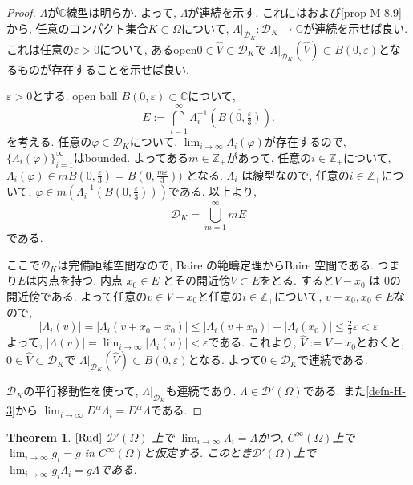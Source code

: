 \documentclass[dvipdfmx,a4paper,11pt]{article} %
\newtheorem{thm}{Theorem}[section]
\theoremstyle{definition}
\theoremstyle{remark}
\numberwithin{equation}{section}
\newcommand{\N}{\mathbb{Z}_+}
\newcommand{\C}{\mathbb{C}}
\begin{document}
\begin{proof}
$\Lambda$が$\mathbb{C}$線型は明らか. 
よって, $\Lambda$が連続を示す. 
これには\cite[Thm 6.6]{Rud}および\ref{prop-M-8.9}から, 
任意のコンパクト集合$K \subset \Omega$について, $\Lambda|_{\mathcal{D}_K} : \mathcal{D}_K \to \C$が連続を示せば良い. 
これは任意の$\varepsilon >0$について, あるopen$0 \in \widehat{V} \subset \mathcal{D}_K $で
$\Lambda|_{\mathcal{D}_K} (\widehat{V})  \subset B(0, \varepsilon) $となるものが存在することを示せば良い. 

$\varepsilon >0$とする. 
open ball $B(0,\varepsilon) \subset \mathbb{C}$について, 
\[
E := \bigcap_{i=1}^\infty \Lambda_i^{-1}(
\overline{B(0,\tfrac{\varepsilon}{3})}).
\]
を考える. 
任意の$\varphi \in \mathcal{D}_K$について, 
$\lim_{i \to \infty} \Lambda_i(\varphi)$が存在するので, 
$\{\Lambda_i(\varphi)\}_{i=1}^\infty$はbounded.
よってある$m \in \N$があって, 任意の$i \in \N$について, 
$\Lambda_i(\varphi) \in m B(0, \tfrac{\varepsilon}{3})=B(0,\tfrac{m \varepsilon}{3}))$ となる.
$\Lambda_i$ は線型なので, 任意の$i \in \N$について,
$\varphi \in m (\Lambda_i^{-1}(B(0,\tfrac{\varepsilon}{3})))$である. 
以上より, 
$$
\mathcal{D}_K = \bigcup_{m=1}^\infty m E
$$
である. 

ここで$\mathcal{D}_K$は完備距離空間なので, Baire の範疇定理からBaire 空間である. 
つまり$E$は内点を持つ.
内点 $x_0 \in E$ とその開近傍$V \subset E$をとる. 
すると$ V - x_0$ は $0$の開近傍である. 
よって任意の$v \in V - x_0$と任意の$i \in \N$について, 
$v+x_0, x_0 \in E$なので, 
\[
|\Lambda_i(v)| 
= |\Lambda_i(v+x_0 - x_0)| 
\le |\Lambda_i(v+x_0)| + |\Lambda_i(x_0)| 
\le \tfrac{2}{3} \varepsilon
<\varepsilon
\]
よって, $|\Lambda(v)| = \lim_{i \to \infty} |\Lambda_i(v)| < \varepsilon$である. 
これより, $\widehat{V} := V - x_0$とおくと,  
$0 \in \widehat{V} \subset \mathcal{D}_K $で
$\Lambda|_{\mathcal{D}_K} (\widehat{V})  \subset B(0, \varepsilon)$となる. 
よって$0 \in \mathcal{D}_K$で連続である. 

$\mathcal{D}_K$の平行移動性を使って, 
$\Lambda|_{\mathcal{D}_K}$も連続であり. $\Lambda \in \mathcal{D}'(\Omega)$である. 
また\ref{defn-H-3}から
\(
\lim_{i \to \infty} D^\alpha \Lambda_i = D^\alpha \Lambda
\)である. 
\end{proof}

\begin{tcolorbox}[mybox]
\begin{thm}{$\cite[Thm 6.18]{Rud}$}
\label{thm-H-17}
$\mathcal{D}'(\Omega)$ 上で
$\lim_{i \to \infty} \Lambda_i = \Lambda$かつ, 
$C^\infty(\Omega)$上で$\lim_{i \to \infty} g_i = g$ in $C^\infty(\Omega)$と仮定する.
このとき$\mathcal{D}'(\Omega)$上で
\(
\lim_{i \to \infty} g_i \Lambda_i = g \Lambda
\)である. 
\end{thm}
\end{tcolorbox}
\end{document}

